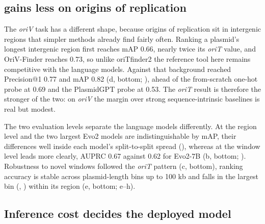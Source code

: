 \subsection*{\model gains less on origins of replication}
\label{sec:origin-oriv}

The \emph{oriV} task has a different shape, because origins of replication
sit in intergenic regions that simpler methods already find fairly often.
Ranking a plasmid's longest intergenic region first reaches mAP 0.66, nearly
twice its \emph{oriT} value, and OriV-Finder \cite{li2025orivfinder}
reaches 0.73, so unlike oriTfinder2 the reference tool here remains
competitive with the language models. Against that background \model reached
Precision@1 0.77 and mAP 0.82 (d, bottom;
), ahead of the from-scratch one-hot probe at 0.69 and
the PlasmidGPT probe at 0.53. The \emph{oriT} result is therefore the stronger
of the two: on \emph{oriV} the margin over strong sequence-intrinsic baselines
is real but modest.

The two evaluation levels separate the language models differently. At the
region level \model and the two largest Evo2 models are indistinguishable by
mAP, their differences well inside each model's split-to-split spread
(), whereas at the window level \model leads
more clearly, AUPRC 0.67 against 0.62 for Evo2-7B (b, bottom;
). Robustness to novel windows followed the \emph{oriT}
pattern (c, bottom), ranking accuracy is stable
across plasmid-length bins up to 100 kb and falls in the largest bin
(, )
within its region (e, bottom;
e--h).


\subsection*{Inference cost decides the deployed model}
\label{sec:origin-cost}

